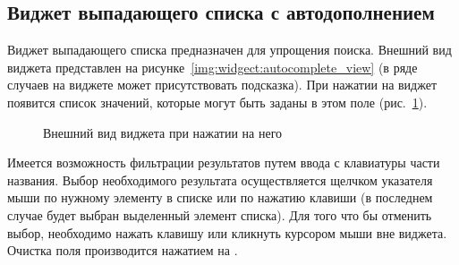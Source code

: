 \subsection{Виджет выпадающего списка с автодополнением}
\label{widget:autocomplete}
Виджет выпадающего списка предназначен для упрощения поиска. Внешний вид виджета представлен на рисунке~\ref{img:widgect:autocomplete_view} (в ряде случаев на виджете может присутствовать подсказка). При нажатии на виджет появится список значений, которые могут быть заданы в этом поле (рис.~\ref{img:widgect:autocomplete_open_view}).
\begin{figure}[H]
	\caption{Внешний вид виджета при нажатии на него}
	\label{img:widgect:autocomplete_open_view}
\end{figure}

Имеется возможность фильтрации результатов путем ввода с клавиатуры части названия. Выбор необходимого результата осуществляется щелчком указателя мыши по нужному элементу в списке или по нажатию клавиши \keys{\enter} (в последнем случае будет выбран выделенный элемент списка). Для того что бы отменить выбор, необходимо нажать клавишу \keys{\esc} или кликнуть курсором мыши вне виджета. Очистка поля производится нажатием на .
